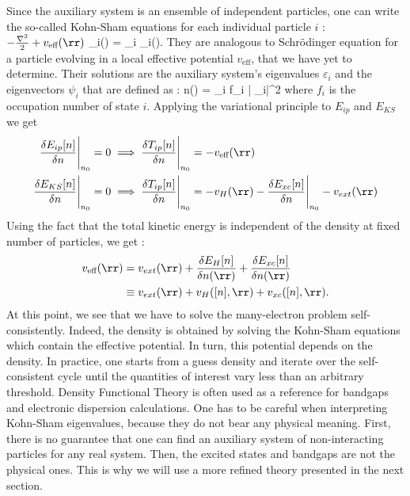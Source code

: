 Since the auxiliary system is an ensemble of independent particles, one can write the so-called Kohn-Sham equations for each individual particle $i$ :
\be
 	\( -\frac{\nabla^2}{2} + v_{\text{eff}}(\rr)\) \psi_i(\rr) = \varepsilon_i \psi_i(\rr).
\ee
They are analogous to Schrödinger equation for a particle evolving in a local effective potential $v_{\text{eff}}$, that we have yet to determine. Their solutions are the auxiliary system's eigenvalues $\varepsilon_i$ and the eigenvectors $\psi_i$ that are defined as :
\be
 	n(\rr) = \sum_i f_i \left| \psi_i\right|^2 \label{eq:DFT_n_vs_psi}
\ee
where $f_i$ is the occupation number of state $i$. 
Applying the variational principle to $E_{ip}$ and $E_{KS}$ we get 
\begin{align}
    \frac{\delta E_{ip}[n]}{\delta n} \Biggr|_{n_0} = 0 &\implies \frac{\delta T_{ip}[n]}{\delta n} \Biggr|_{n_0} = - v_{\text{eff}}(\rr) \\
    \frac{\delta E_{KS}[n]}{\delta n} \Biggr|_{n_0} = 0 &\implies \frac{\delta T_{ip}[n]}{\delta n} \Biggr|_{n_0} = - v_H(\rr) - \frac{\delta E_{xc}[n]}{\delta n} \Biggr|_{n_0} - v_{ext}(\rr)
\end{align}
Using the fact that the total kinetic energy is independent of the density at fixed number of particles, we get :
\begin{align}
\begin{split}
	v_{\text{eff}}(\rr) &= v_{ext}(\rr) + \frac{\delta E_H[n]}{\delta n(\rr)} + \frac{\delta E_{xc}[n]}{\delta n(\rr)} \\
	&\equiv v_{ext}(\rr) + v_H([n],\rr) + v_{xc}([n],\rr).
\end{split}
\end{align}
At this point, we see that we have to solve the many-electron problem self-consistently. Indeed, the density is obtained by solving the Kohn-Sham equations which contain the effective potential. In turn, this potential depends on the density. In practice, one starts from a guess density and iterate over the self-consistent cycle until the quantities of interest vary less than an arbitrary threshold.
Density Functional Theory is often used as a reference for bandgaps and electronic dispersion calculations. One has to be careful when interpreting Kohn-Sham eigenvalues, because they do not bear any physical meaning. First, there is no guarantee that one can find an auxiliary system of non-interacting particles for any real system. Then, the excited states and bandgaps are not the physical ones. This is why we will use a more refined theory presented in the next section.

